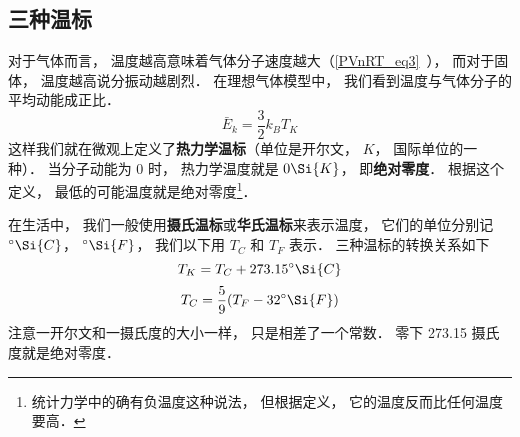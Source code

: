 

\subsection{三种温标}
对于气体而言， 温度越高意味着气体分子速度越大（\autoref{PVnRT_eq3}~）， 而对于固体， 温度越高说分振动越剧烈． 在理想气体模型中， 我们看到温度与气体分子的平均动能成正比． 
\begin{equation}
\bar E_k = \frac{3}{2} k_B T_K
\end{equation}
这样我们就在微观上定义了\textbf{热力学温标}（单位是开尔文， $K$， 国际单位的一种）． 当分子动能为 0 时， 热力学温度就是 $0 \Si{K}$， 即\textbf{绝对零度}． 根据这个定义， 最低的可能温度就是绝对零度\footnote{统计力学中的确有负温度这种说法， 但根据定义， 它的温度反而比任何温度要高．}．

在生活中， 我们一般使用\textbf{摄氏温标}或\textbf{华氏温标}来表示温度， 它们的单位分别记 $^\circ\Si{C}$， $^\circ\Si{F}$， 我们以下用 $T_C$ 和 $T_F$ 表示． 三种温标的转换关系如下
\begin{equation}
T_K = T_C + 273.15^\circ\Si{C}
\end{equation}
\begin{equation}
T_C = \frac{5}{9}(T_F - 32^\circ\Si{F})
\end{equation}
注意一开尔文和一摄氏度的大小一样， 只是相差了一个常数． 零下 273.15 摄氏度就是绝对零度．
